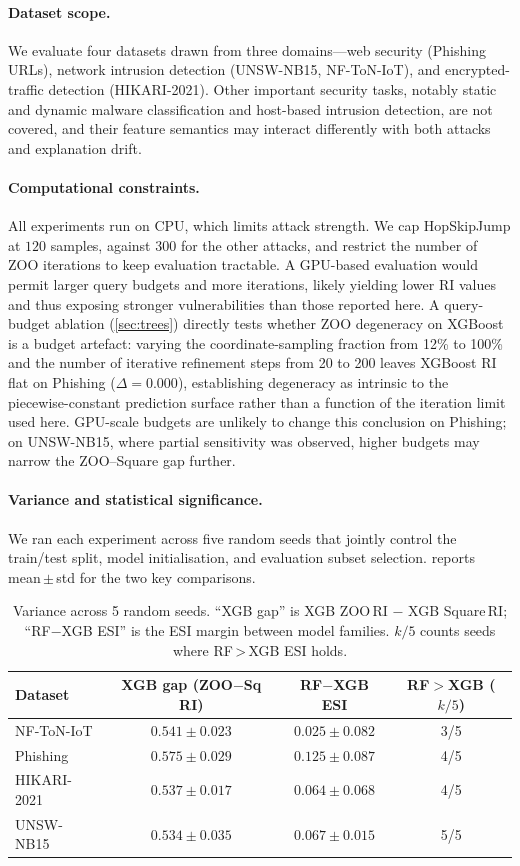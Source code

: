 \documentclass[runningheads]{llncs}
\begin{document}
\paragraph{Dataset scope.}
We evaluate four datasets drawn from three domains---web security (Phishing URLs),
network intrusion detection (UNSW-NB15, NF-ToN-IoT), and encrypted-traffic
detection (HIKARI-2021).  Other important security tasks, notably static and
dynamic malware classification and host-based intrusion detection, are not
covered, and their feature semantics may interact differently with both attacks
and explanation drift.

\paragraph{Computational constraints.}
All experiments run on CPU, which limits attack strength.  We cap HopSkipJump
at $120$ samples, against $300$ for the other attacks, and restrict the number of
ZOO iterations to keep evaluation tractable.  A GPU-based evaluation would permit
larger query budgets and more iterations, likely yielding lower RI values and thus
exposing stronger vulnerabilities than those reported here.  A query-budget
ablation (\cref{sec:trees}) directly tests whether ZOO degeneracy on XGBoost is
a budget artefact: varying the coordinate-sampling fraction from 12\% to 100\%
and the number of iterative refinement steps from 20 to 200 leaves XGBoost RI
flat on Phishing ($\Delta = 0.000$), establishing degeneracy as intrinsic to
the piecewise-constant prediction surface rather than a function of the iteration
limit used here.  GPU-scale budgets are unlikely to change this conclusion on
Phishing; on UNSW-NB15, where partial sensitivity was observed, higher budgets
may narrow the ZOO--Square gap further.

\paragraph{Variance and statistical significance.}
We ran each experiment across five random seeds that jointly control the
train/test split, model initialisation, and evaluation subset selection.
 reports mean\,$\pm$\,std for the two key comparisons.

\begin{table}[t]
\caption{Variance across 5 random seeds.  ``XGB gap'' is XGB ZOO\,RI $-$
XGB Square\,RI; ``RF$-$XGB ESI'' is the ESI margin between model families.
$k/5$ counts seeds where RF\,>\,XGB ESI holds.}
\label{tab:variance}
\centering
\small
\begin{tabular}{lccc}
\toprule
Dataset & XGB gap (ZOO$-$Sq RI) & RF$-$XGB ESI & RF$>$XGB ($k/5$) \\
\midrule
NF-ToN-IoT  & $0.541 \pm 0.023$ & $0.025 \pm 0.082$ & 3/5 \\
Phishing    & $0.575 \pm 0.029$ & $0.125 \pm 0.087$ & 4/5 \\
HIKARI-2021 & $0.537 \pm 0.017$ & $0.064 \pm 0.068$ & 4/5 \\
UNSW-NB15   & $0.534 \pm 0.035$ & $0.067 \pm 0.015$ & 5/5 \\
\bottomrule
\end{tabular}
\end{table}
\end{document}
